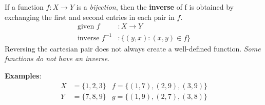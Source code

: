 If a function $f: X \rightarrow Y$ is a \textit{bijection},
then the \textbf{inverse} of f is obtained by exchanging the first and second entries in each pair in $f$.
\begin{align*}
  \text{given } f        & : X \rightarrow Y           \\
  \text{inverse } f^{-1} & : \{(y, x) : (x, y) \in f\}
\end{align*}
Reversing the cartesian pair does not always create a well-defined function.
\textit{Some functions do not have an inverse}.

\textbf{Examples}:
\begin{align*}
  X & = \{1, 2, 3\} & f = \{(1, 7), (2, 9), (3, 9)\} \\
  Y & = \{7, 8, 9\} & g = \{(1, 9), (2, 7), (3, 8)\}
\end{align*}

